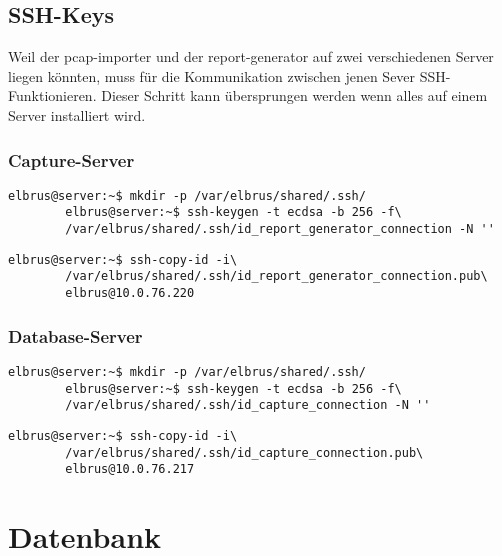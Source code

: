 \documentclass{article}
\begin{document}
	\newpage
	\subsection{SSH-Keys}
	
	Weil der pcap-importer und der report-generator auf zwei verschiedenen Server liegen könnten, muss für die Kommunikation zwischen jenen Sever SSH-Funktionieren.
	\newline\newline
	Dieser Schritt kann übersprungen werden wenn alles auf einem Server installiert wird.
	
	\subsubsection{Capture-Server}
	\begin{lstlisting}[caption={Anlegen der SSH-Keys}]
		elbrus@server:~$ mkdir -p /var/elbrus/shared/.ssh/
		elbrus@server:~$ ssh-keygen -t ecdsa -b 256 -f\
		/var/elbrus/shared/.ssh/id_report_generator_connection -N ''
	\end{lstlisting}
	
	\begin{lstlisting}[caption={Übertragen der SSH-Keys auf den Database-Server.}]
		elbrus@server:~$ ssh-copy-id -i\
		/var/elbrus/shared/.ssh/id_report_generator_connection.pub\
		elbrus@10.0.76.220
	\end{lstlisting}
	
	\subsubsection{Database-Server}
	\begin{lstlisting}[caption={Anlegen der SSH-Keys}]
		elbrus@server:~$ mkdir -p /var/elbrus/shared/.ssh/
		elbrus@server:~$ ssh-keygen -t ecdsa -b 256 -f\
		/var/elbrus/shared/.ssh/id_capture_connection -N ''
	\end{lstlisting}
	
	\begin{lstlisting}[caption={Übertragen der SSH-Keys auf den Capture-Server.}]
		elbrus@server:~$ ssh-copy-id -i\
		/var/elbrus/shared/.ssh/id_capture_connection.pub\
		elbrus@10.0.76.217
	\end{lstlisting}
	
	\newpage
	\section{Datenbank}
\end{document}
